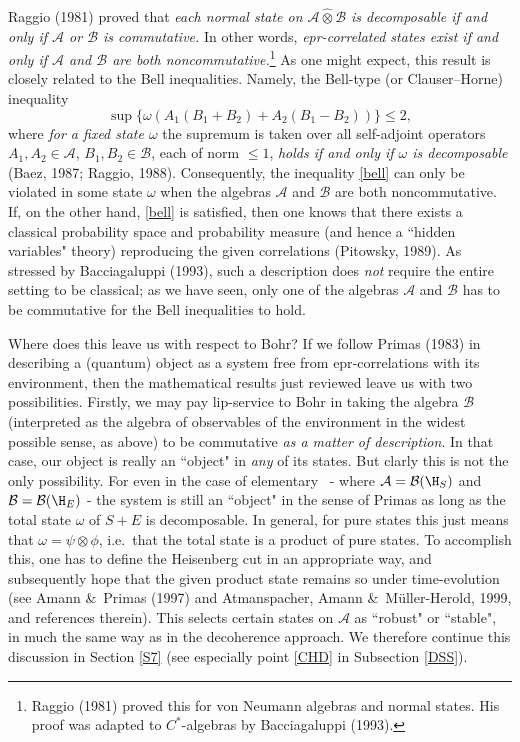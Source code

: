 \documentclass[12pt,titlepage]{article}
\newcommand{\epr}{{\sc epr}}
\newcommand{\beq}{\begin{equation}}
\newcommand{\eeq}{\end{equation}}
\newcommand{\ca}{$C^*$-algebra} \newcommand{\jba}{JB-algebra}
\newcommand{\ot}{\otimes}
\newcommand{\er}{\eqref}
\newcommand{\om}{\omega} \newcommand{\Om}{\Omega}
\newcommand{\CA}{{\mathcal A}} \newcommand{\CB}{{\mathcal B}}
\begin{document}
Raggio (1981) proved  that {\it 
each normal state on $\CA\hat{\otimes}\CB$  is decomposable 
 if and only if  $\CA$ or $\CB$ is commutative.} In other words, {\it \epr-correlated states exist  if and only if  $\CA$ and $\CB$ are both noncommutative.}\footnote{Raggio (1981) proved this for von Neumann algebras and normal states. His proof was adapted to \ca s by Bacciagaluppi (1993).}
As one might expect, this result is closely related to the  Bell inequalities. Namely,
 the Bell-type (or Clauser--Horne) inequality
\beq \sup\{\om(A_1(B_1+B_2)+A_2(B_1-B_2))\} \leq 2, \label{bell}
\eeq
 where {\it for a fixed state $\om$} the supremum is taken over all self-adjoint operators $A_1,A_2\in \CA$, $B_1,B_2\in\CB$, each of norm $\leq 1$, {\it holds if and only if $\om$ is decomposable} (Baez, 1987; Raggio, 1988). 
Consequently, the inequality \er{bell} can only be violated in some state $\om$ when 
 the algebras $\CA$ and $\CB$ are both noncommutative. If, on the other hand, \er{bell} is satisfied, then one knows that there exists a classical probability space and probability measure
(and hence a ``hidden variables" theory) reproducing the given correlations (Pitowsky, 1989). As stressed by  Bacciagaluppi (1993), such a description does {\it not} require the entire setting to be classical; as we have seen, only one of the algebras $\CA$ and $\CB$ has to be commutative for the  Bell inequalities to hold. 

Where does this leave us with respect to Bohr? If we follow Primas (1983) in 
describing a (quantum) object as a system free from \epr-correlations with its environment, then the mathematical results just reviewed leave us with two possibilities.  Firstly, we may pay lip-service to Bohr in taking the algebra $\CB$ (interpreted as the algebra of observables of the environment in the widest possible sense, as above) to be commutative {\it as a matter of description}. In that case, our object is really an ``object" in {\it any} of its states. 
 But clarly this  is not the only possibility. For even in the case of elementary \qm\ - where $\CA=\CB(\H_S)$ and $\CB=\CB(\H_E)$ -  the system is still an ``object" in the sense of Primas as long as the total state
$\om$ of $S+E$ is decomposable. In general, for pure states this just means that $\om=\psi\ot\phi$, i.e.\ that the total state is a product of pure states. To accomplish this, one has to define the Heisenberg cut in an appropriate way, and subsequently hope that
the given product state remains so under time-evolution (see  
Amann \&\ Primas (1997) and Atmanspacher,  Amann \&\  M\"{u}ller-Herold, 1999, and references therein). This selects certain states on $\CA$ as ``robust" or ``stable", in much the same way as in the decoherence approach. We therefore continue this discussion in Section \ref{S7} (see especially point \ref{CHD} in Subsection \ref{DSS}).
\end{document}

